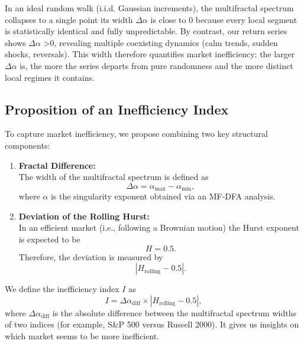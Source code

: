 \documentclass[11pt]{extarticle}
\begin{document}
In an ideal random walk (i.i.d. Gaussian increments), the multifractal spectrum collapses to a single point its width
$\Delta \alpha$ is close to 0 because every local segment is statistically identical and fully unpredictable. By contrast, our
return series shows $\Delta \alpha$ >0, revealing multiple coexisting dynamics (calm trends, sudden shocks, reversals).
This width therefore quantifies market inefficiency: the larger $\Delta \alpha$ is, the more the series departs from pure randomness
and the more distinct local regimes it contains.



\subsection{Proposition of an Inefficiency Index}

To capture market inefficiency, we propose combining two key structural components:

\begin{enumerate}
    \item \textbf{Fractal Difference:}\\[1ex]
    The width of the multifractal spectrum is defined as
    \begin{equation}
    \Delta \alpha = \alpha_{\text{max}} - \alpha_{\text{min}},
    \end{equation}
    where $\alpha$ is the singularity exponent obtained via an MF-DFA analysis.

    \item \textbf{Deviation of the Rolling Hurst:}\\[1ex]
    In an efficient market (i.e., following a Brownian motion) the Hurst exponent is expected to be
    \begin{equation}
    H = 0.5.
    \end{equation}
    Therefore, the deviation is measured by
    \begin{equation}
    \left|H_{\text{rolling}} - 0.5\right|.
    \end{equation}
\end{enumerate}

We define the inefficiency index $I$ as
\begin{equation}
I = \Delta\alpha_{\text{diff}} \times \left|H_{\text{rolling}} - 0.5\right|,
\end{equation}
where $\Delta\alpha_{\text{diff}}$ is the absolute difference between the multifractal spectrum widths of two indices (for example, S\&P 500 versus Russell 2000).
It gives us insights on which market seems to be more inefficient.
\end{document}
